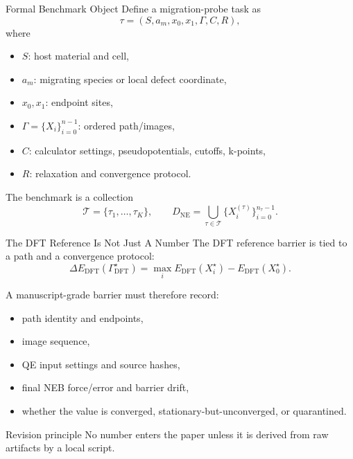 \documentclass[aspectratio=169,10pt]{beamer}
\newcommand{\Dne}{D_{\mathrm{NE}}}
\newcommand{\Edft}{E_{\mathrm{DFT}}}
\newcommand{\Gdft}{\Gamma_{\mathrm{DFT}}^\star}
\begin{document}
\begin{frame}{Formal Benchmark Object}
  Define a migration-probe task as
  \[
  \tau = (S, a_m, x_0, x_1, \Gamma, C, R),
  \]
  where
  \begin{itemize}
    \item $S$: host material and cell,
    \item $a_m$: migrating species or local defect coordinate,
    \item $x_0,x_1$: endpoint sites,
    \item $\Gamma=\{X_i\}_{i=0}^{n-1}$: ordered path/images,
    \item $C$: calculator settings, pseudopotentials, cutoffs, k-points,
    \item $R$: relaxation and convergence protocol.
  \end{itemize}

  \vspace{0.2cm}
  The benchmark is a collection
  \[
  \mathcal{T}=\{\tau_1,\ldots,\tau_K\}, \qquad
  \Dne = \bigcup_{\tau\in\mathcal{T}}\{X_i^{(\tau)}\}_{i=0}^{n_\tau-1}.
  \]
\end{frame}

\begin{frame}{The DFT Reference Is Not Just A Number}
  The DFT reference barrier is tied to a path and a convergence protocol:
  \[
  \Delta E_{\mathrm{DFT}}(\Gdft)
  =
  \max_i \Edft(X_i^\star)-\Edft(X_0^\star).
  \]

  \vspace{0.25cm}
  A manuscript-grade barrier must therefore record:
  \begin{itemize}
    \item path identity and endpoints,
    \item image sequence,
    \item QE input settings and source hashes,
    \item final NEB force/error and barrier drift,
    \item whether the value is converged, stationary-but-unconverged, or quarantined.
  \end{itemize}

  \vspace{0.25cm}
  \begin{block}{Revision principle}
  No number enters the paper unless it is derived from raw artifacts by a local script.
  \end{block}
\end{frame}
\end{document}
